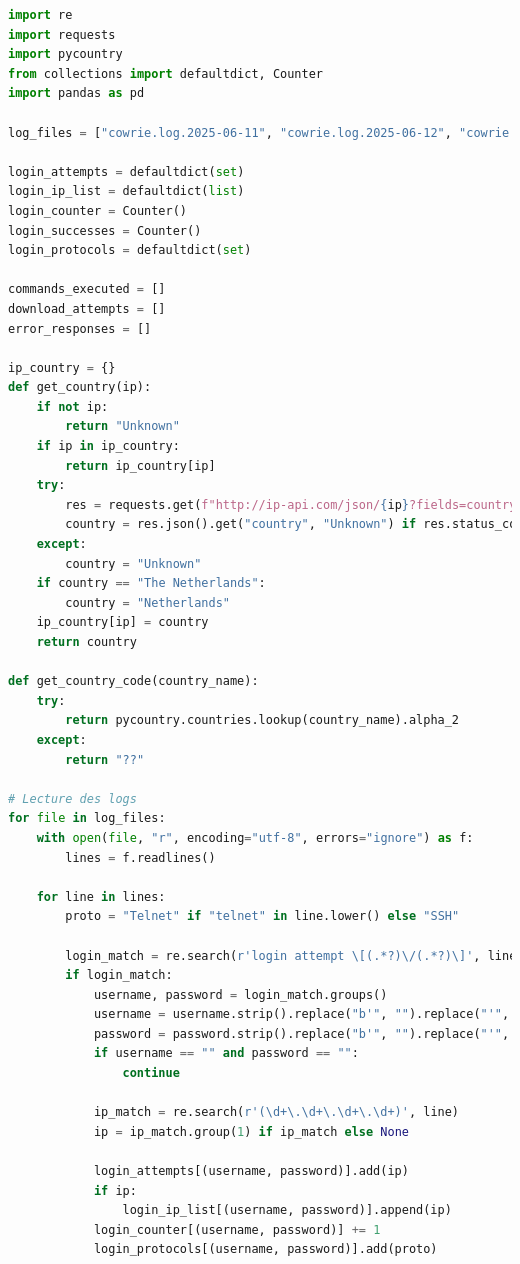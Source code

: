 \label{annex:log-python}  
\begin{lstlisting}[language=python,label={lst:cowrie-python},caption={Post-Attack Analysis Python Script}] 
import re
import requests
import pycountry
from collections import defaultdict, Counter
import pandas as pd

log_files = ["cowrie.log.2025-06-11", "cowrie.log.2025-06-12", "cowrie.log.2025-06-13"]

login_attempts = defaultdict(set)
login_ip_list = defaultdict(list)
login_counter = Counter()
login_successes = Counter()
login_protocols = defaultdict(set)

commands_executed = []
download_attempts = []
error_responses = []

ip_country = {}
def get_country(ip):
    if not ip:
        return "Unknown"
    if ip in ip_country:
        return ip_country[ip]
    try:
        res = requests.get(f"http://ip-api.com/json/{ip}?fields=country", timeout=3)
        country = res.json().get("country", "Unknown") if res.status_code == 200 else "Unknown"
    except:
        country = "Unknown"
    if country == "The Netherlands":
        country = "Netherlands"
    ip_country[ip] = country
    return country

def get_country_code(country_name):
    try:
        return pycountry.countries.lookup(country_name).alpha_2
    except:
        return "??"

# Lecture des logs
for file in log_files:
    with open(file, "r", encoding="utf-8", errors="ignore") as f:
        lines = f.readlines()

    for line in lines:
        proto = "Telnet" if "telnet" in line.lower() else "SSH"

        login_match = re.search(r'login attempt \[(.*?)\/(.*?)\]', line)
        if login_match:
            username, password = login_match.groups()
            username = username.strip().replace("b'", "").replace("'", "")
            password = password.strip().replace("b'", "").replace("'", "")
            if username == "" and password == "":
                continue

            ip_match = re.search(r'(\d+\.\d+\.\d+\.\d+)', line)
            ip = ip_match.group(1) if ip_match else None

            login_attempts[(username, password)].add(ip)
            if ip:
                login_ip_list[(username, password)].append(ip)
            login_counter[(username, password)] += 1
            login_protocols[(username, password)].add(proto)


\end{lstlisting}
